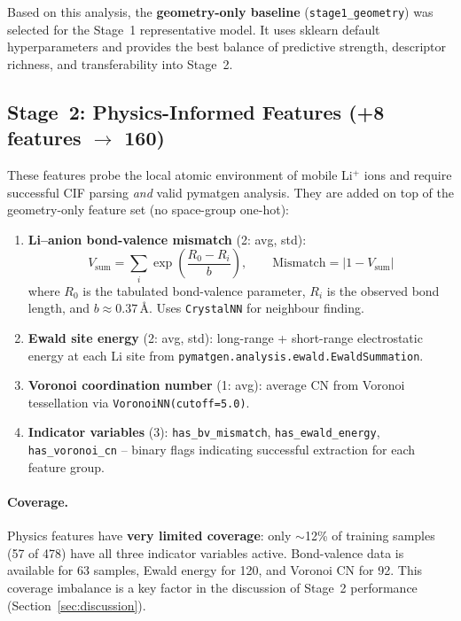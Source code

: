 \documentclass[11pt,a4paper]{article}
\begin{document}
Based on this analysis, the \textbf{geometry-only baseline}
(\texttt{stage1\_geometry}) was selected for the Stage~1 representative model.
It uses sklearn default hyperparameters and provides the best balance of
predictive strength, descriptor richness, and transferability into Stage~2.

\subsection{Stage~2: Physics-Informed Features (+8 features $\to$ 160)}

These features probe the local atomic environment of mobile Li$^+$ ions and
require successful CIF parsing \emph{and} valid pymatgen analysis.  They are
added on top of the geometry-only feature set (no space-group one-hot):

\begin{enumerate}[leftmargin=*]
      \item \textbf{Li--anion bond-valence mismatch} (2: avg, std):
            \[
                  V_{\text{sum}} = \sum_i \exp\!\left(\frac{R_0 - R_i}{b}\right),
                  \qquad
                  \text{Mismatch} = |1 - V_{\text{sum}}|
            \]
            where $R_0$ is the tabulated bond-valence parameter, $R_i$ is the observed
            bond length, and $b \approx 0.37$\,\AA.  Uses \texttt{CrystalNN} for
            neighbour finding.

      \item \textbf{Ewald site energy} (2: avg, std): long-range + short-range
            electrostatic energy at each Li site from
            \texttt{pymatgen.analysis.ewald.EwaldSummation}.

      \item \textbf{Voronoi coordination number} (1: avg): average CN from
            Voronoi tessellation via \texttt{VoronoiNN(cutoff=5.0)}.

      \item \textbf{Indicator variables} (3): \texttt{has\_bv\_mismatch},
            \texttt{has\_ewald\_energy}, \texttt{has\_voronoi\_cn} -- binary flags
            indicating successful extraction for each feature group.
\end{enumerate}

\paragraph{Coverage.}
Physics features have \textbf{very limited coverage}: only $\sim$12\% of
training samples (57 of 478) have all three indicator variables active.
Bond-valence data is available for 63 samples, Ewald energy for 120, and
Voronoi CN for 92.  This coverage imbalance is a key factor in the discussion
of Stage~2 performance (Section~\ref{sec:discussion}).
\end{document}
